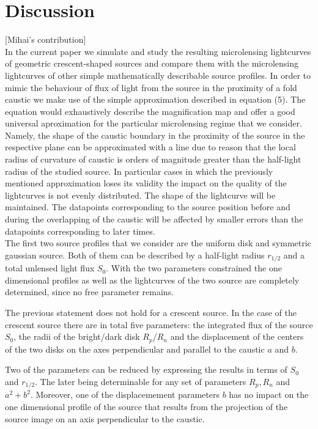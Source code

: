 \section{Discussion}
[Mihai's contribution]\\
In the current paper we simulate and study the resulting microlensing lightcurves of geometric crescent-shaped sources 
and compare them with the microlensing lightcurves of other simple mathematically describable source profiles. 
In order to mimic the behaviour of flux of light from the source in the proximity of a fold caustic we make use of the simple approximation described in equation (5). 
The equation would exhaustively describe the magnification map and offer a good universal aproximation for the 
particular microlensing regime that we consider. 
Namely, the shape of the caustic boundary in the proximity of the source in the respective plane can be approximated with
 a line due to reason that the local radius of curvature of caustic is orders of magnitude greater than the half-light
 radius of the studied source. 
In particular cases in which the previously mentioned approximation loses its validity the impact on the quality of the 
lightcurves is not evenly distributed. The shape of the lightcurve will be maintained. 
The datapoints corresponding to the source position before and during the overlapping of the caustic will be affected by
 smaller errors than the datapoints corresponding to later times. \\

The first two source profiles that we consider are the uniform disk and symmetric gaussian source. 
Both of them can be described by a half-light radius $r_{1/2}$ and a total unlensed light flux $S_0$. 
With the two parameters constrained the one dimensional profiles as well as the lightcurves of the two source are completely determined, since no free parameter remains. 

The previous statement does not hold for a crescent source.
In the case of the crescent source there are in total five parameters: the integrated flux of the source $S_0$,
 the radii of the bright/dark disk $R_p$/$R_n$ and the displacement of the centers of the two disks on the axes perpendicular and parallel to the caustic $a$ and $b$. 

Two of the parameters can be reduced by expressing the results in terms of $S_0$ and $r_{1/2}$. 
The later being determinable for any set of parameters $R_p, R_n$ and $a^2+b^2$. Moreover, one of the displacemement 
parameters $b$ has no impact on the one dimensional profile of the source that results from the projection of the source image on an axis perpendicular to the caustic. 

